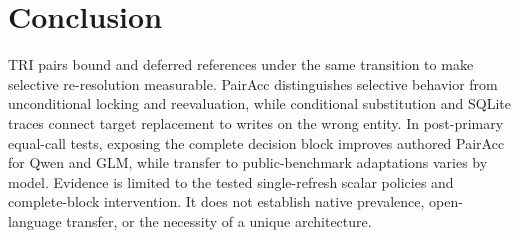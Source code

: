 \documentclass[letterpaper]{article}
\begin{document}
\section{Conclusion}

TRI pairs bound and deferred references under the same transition to make selective re-resolution
measurable. PairAcc distinguishes selective behavior from unconditional locking and reevaluation,
while conditional substitution and SQLite traces connect target replacement to writes on the wrong
entity. In post-primary equal-call tests, exposing the complete decision block improves authored
PairAcc for Qwen and GLM, while transfer to public-benchmark adaptations varies by model. Evidence
is limited to the tested single-refresh scalar policies and complete-block intervention. It does
not establish native prevalence, open-language transfer, or the necessity of a unique architecture.

\clearpage
{\small

}
\end{document}
